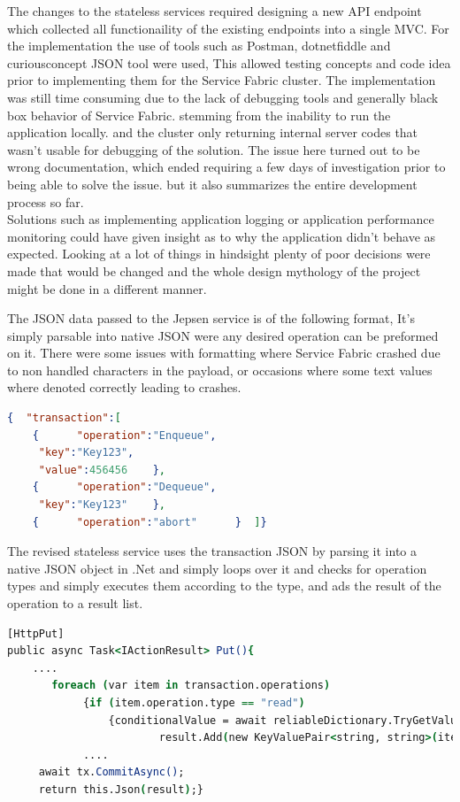 \documentclass[a4paper,10pt,titlepage]{report}
\begin{document}
    The changes to the stateless services required designing a new API endpoint which collected all functionaility of the existing endpoints into a single MVC. For the implementation the use of tools such as Postman, dotnetfiddle and curiousconcept JSON tool were used, This allowed testing concepts and code idea prior to implementing them for the Service Fabric cluster. The implementation was still time consuming due to the lack of debugging tools and generally black box behavior of Service Fabric. stemming from the inability  to run the application locally. and the cluster only returning internal server codes that wasn't usable for debugging of the solution. The issue here turned out to be wrong documentation, which ended requiring a few days of investigation prior to being able to solve the issue. but it also summarizes the entire development process so far.\\
    
    Solutions such as implementing application logging or application performance monitoring could have given insight as to why the application didn't behave as expected. Looking at a lot of things in hindsight plenty of poor decisions were made that would be changed and the whole design mythology of the project might be done in a different manner.
    
    \vspace{5mm}
    
    The JSON data passed to the Jepsen service is of the following format, It's simply parsable into native JSON were any desired operation can be preformed on it. There were some issues with formatting where Service Fabric crashed due to non handled characters in the payload, or occasions where some text values where denoted correctly leading to crashes. \\
    \begin{lstlisting}[language=json]
{  "transaction":[
    {      "operation":"Enqueue",
     "key":"Key123",
     "value":456456    },
    {      "operation":"Dequeue",
     "key":"Key123"    },
    {      "operation":"abort"      }  ]}
    \end{lstlisting}  
    
    The revised stateless service uses the transaction JSON by parsing it into a native JSON object in .Net and simply loops over it and checks for operation types and simply executes them according to the type, and ads the result of the operation to a result list.
    \begin{lstlisting}[language=csh]
[HttpPut]
public async Task<IActionResult> Put(){
    ....
       foreach (var item in transaction.operations)
            {if (item.operation.type == "read")
                {conditionalValue = await reliableDictionary.TryGetValueAsync(tx, item.key.Value);
                        result.Add(new KeyValuePair<string, string>(item.key.Value, value.ToString()));}
            ....
     await tx.CommitAsync();
     return this.Json(result);}
\end{lstlisting}  
\end{document}
